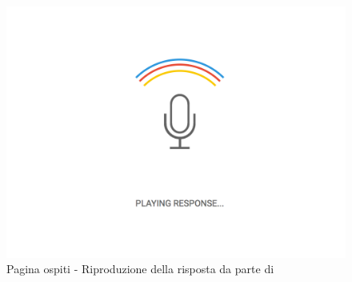 \documentclass[../ManualeUtente_v2.0.0.tex]{subfiles}
\begin{document}
		\begin{figure}[!h]
			\centering
		 	\includegraphics[scale=0.6]{Screenshot/playing-response.png}
			\caption{Pagina ospiti - Riproduzione della risposta da parte di \atavi}
			\label{fig:label}
		\end{figure}
\end{document}
